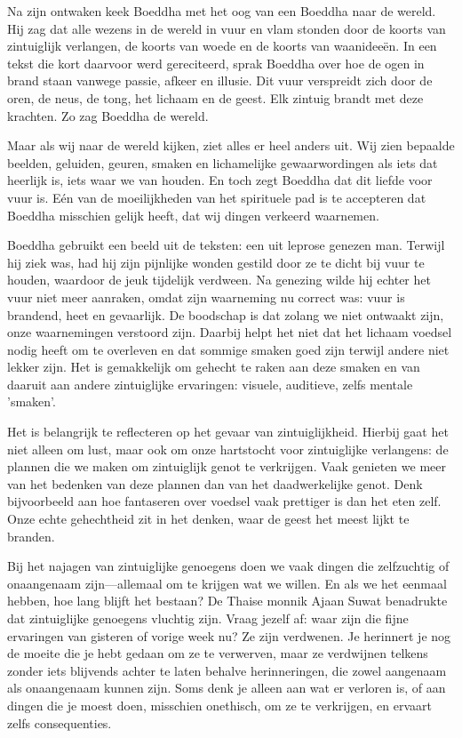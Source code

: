 Na zijn ontwaken keek Boeddha met het oog van een Boeddha naar de wereld. Hij zag dat alle wezens in de wereld in vuur en vlam stonden door de koorts van zintuiglijk verlangen, de koorts van woede en de koorts van waanideeën. In een tekst die kort daarvoor werd gereciteerd, sprak Boeddha over hoe de ogen in brand staan vanwege passie, afkeer en illusie. Dit vuur verspreidt zich door de oren, de neus, de tong, het lichaam en de geest. Elk zintuig brandt met deze krachten. Zo zag Boeddha de wereld.

Maar als wij naar de wereld kijken, ziet alles er heel anders uit. Wij zien bepaalde beelden, geluiden, geuren, smaken en lichamelijke gewaarwordingen als iets dat heerlijk is, iets waar we van houden. En toch zegt Boeddha dat dit liefde voor vuur is. Eén van de moeilijkheden van het spirituele pad is te accepteren dat Boeddha misschien gelijk heeft, dat wij dingen verkeerd waarnemen.

Boeddha gebruikt een beeld uit de teksten: een uit leprose genezen man. Terwijl hij ziek was, had hij zijn pijnlijke wonden gestild door ze te dicht bij vuur te houden, waardoor de jeuk tijdelijk verdween. Na genezing wilde hij echter het vuur niet meer aanraken, omdat zijn waarneming nu correct was: vuur is brandend, heet en gevaarlijk. De boodschap is dat zolang we niet ontwaakt zijn, onze waarnemingen verstoord zijn. Daarbij helpt het niet dat het lichaam voedsel nodig heeft om te overleven en dat sommige smaken goed zijn terwijl andere niet lekker zijn. Het is gemakkelijk om gehecht te raken aan deze smaken en van daaruit aan andere zintuiglijke ervaringen: visuele, auditieve, zelfs mentale 'smaken'.

Het is belangrijk te reflecteren op het gevaar van zintuiglijkheid. Hierbij gaat het niet alleen om lust, maar ook om onze hartstocht voor zintuiglijke verlangens: de plannen die we maken om zintuiglijk genot te verkrijgen. Vaak genieten we meer van het bedenken van deze plannen dan van het daadwerkelijke genot. Denk bijvoorbeeld aan hoe fantaseren over voedsel vaak prettiger is dan het eten zelf. Onze echte gehechtheid zit in het denken, waar de geest het meest lijkt te branden.

Bij het najagen van zintuiglijke genoegens doen we vaak dingen die zelfzuchtig of onaangenaam zijn—allemaal om te krijgen wat we willen. En als we het eenmaal hebben, hoe lang blijft het bestaan? De Thaise monnik Ajaan Suwat benadrukte dat zintuiglijke genoegens vluchtig zijn. Vraag jezelf af: waar zijn die fijne ervaringen van gisteren of vorige week nu? Ze zijn verdwenen. Je herinnert je nog de moeite die je hebt gedaan om ze te verwerven, maar ze verdwijnen telkens zonder iets blijvends achter te laten behalve herinneringen, die zowel aangenaam als onaangenaam kunnen zijn. Soms denk je alleen aan wat er verloren is, of aan dingen die je moest doen, misschien onethisch, om ze te verkrijgen, en ervaart zelfs consequenties.

